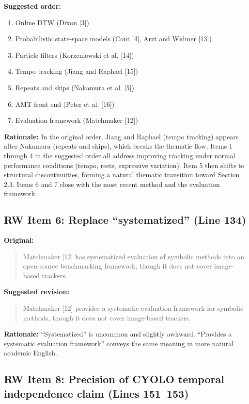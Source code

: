 \documentclass{article}
\begin{document}
\textbf{Suggested order:}
\begin{enumerate}
    \item Online DTW (Dixon [3])
    \item Probabilistic state-space models (Cont [4], Arzt and Widmer [13])
    \item Particle filters (Korzeniowski et al. [14])
    \item Tempo tracking (Jiang and Raphael [15])
    \item Repeats and skips (Nakamura et al. [5])
    \item AMT front end (Peter et al. [16])
    \item Evaluation framework (Matchmaker [12])
\end{enumerate}

\textbf{Rationale:}
In the original order, Jiang and Raphael (tempo tracking) appears after Nakamura (repeats and skips), which breaks the thematic flow. Items 1 through 4 in the suggested order all address improving tracking under normal performance conditions (tempo, rests, expressive variation). Item 5 then shifts to structural discontinuities, forming a natural thematic transition toward Section 2.3. Items 6 and 7 close with the most recent method and the evaluation framework.

\subsection*{RW Item 6: Replace ``systematized'' (Line 134)}

\textbf{Original:}
\begin{quote}
Matchmaker [12] has systematized evaluation of symbolic methods into an open-source benchmarking framework, though it does not cover image-based trackers.
\end{quote}

\textbf{Suggested revision:}
\begin{quote}
Matchmaker [12] provides a systematic evaluation framework for symbolic methods, though it does not cover image-based trackers.
\end{quote}

\textbf{Rationale:}
``Systematized'' is uncommon and slightly awkward. ``Provides a systematic evaluation framework'' conveys the same meaning in more natural academic English.

\subsection*{RW Item 8: Precision of CYOLO temporal independence claim (Lines 151--153)}
\end{document}
